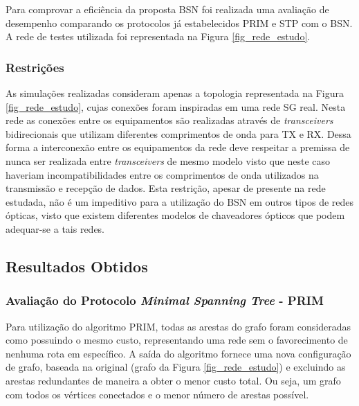 \documentclass[12pt]{article}
\begin{document}
Para comprovar a eficiência da proposta BSN foi realizada uma avaliação de desempenho comparando os protocolos já estabelecidos PRIM e STP com o BSN. A rede de testes utilizada foi representada na Figura \ref{fig_rede_estudo}.

\subsubsection{Restrições}

As simulações realizadas consideram apenas a topologia representada na Figura \ref{fig_rede_estudo}, cujas conexões foram inspiradas em uma rede SG real. Nesta rede as conexões entre os equipamentos são realizadas através de \emph{transceivers} bidirecionais que utilizam diferentes comprimentos de onda para TX e RX. Dessa forma a interconexão entre os equipamentos da rede deve respeitar a premissa de nunca ser realizada entre \emph{transceivers} de mesmo modelo visto que neste caso haveriam incompatibilidades entre os comprimentos de onda utilizados na transmissão e recepção de dados. Esta restrição, apesar de presente na rede estudada, não é um impeditivo para a utilização do BSN em outros tipos de redes ópticas, visto que existem diferentes modelos de chaveadores ópticos que podem adequar-se a tais redes.

\subsection{Resultados Obtidos}
\label{sec:resultados}
\subsubsection{Avaliação do Protocolo \emph{Minimal Spanning Tree} - PRIM}
\label{sec:minimal_spanning_tree}
Para utilização do algoritmo PRIM, todas as arestas do grafo foram consideradas como possuindo o mesmo custo, representando uma rede sem o favorecimento de nenhuma rota em específico. A saída do algoritmo fornece uma nova configuração de grafo, baseada na original (grafo da Figura \ref{fig_rede_estudo}) e excluindo as arestas redundantes de maneira a obter o menor custo total. Ou seja, um grafo com todos os vértices conectados e o menor número de arestas possível.
\end{document}
